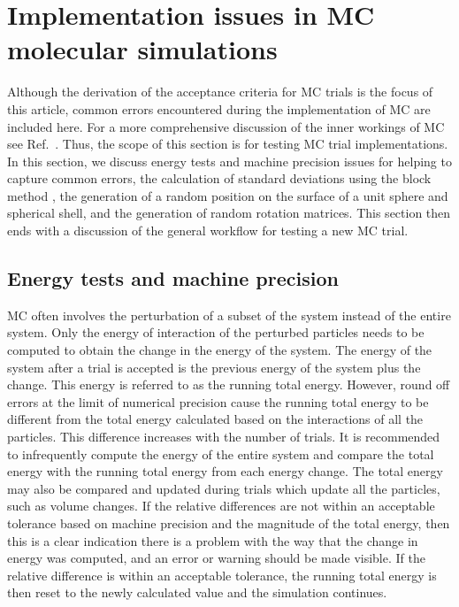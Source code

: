 \documentclass[
  9pt,
  bestpractices,
]{livecoms}
\begin{document}
\section{\label{sec:common_issues}Implementation issues in MC molecular simulations}

Although the derivation of the acceptance criteria for MC trials is the focus of this article, common errors encountered during the implementation of MC are included here.
For a more comprehensive discussion of the inner workings of MC see Ref.~\cite{dubbeldam_inner_2013}.
Thus, the scope of this section is for testing MC trial implementations.
In this section, we discuss energy tests and machine precision issues for helping to capture common errors, the calculation of standard deviations using the block method \cite{flyvbjerg_error_1989, grossfield_best_2018}, the generation of a random position on the surface of a unit sphere and spherical shell, and the generation of random rotation matrices.
This section then ends with a discussion of the general workflow for testing a new MC trial.

\subsection{\label{sec:energy_test}Energy tests and machine precision}

MC often involves the perturbation of a subset of the system instead of the entire system.
Only the energy of interaction of the perturbed particles needs to be computed to obtain the change in the energy of the system.
The energy of the system after a trial is accepted is the previous energy of the system plus the change.
This energy is referred to as the running total energy.
However, round off errors at the limit of numerical precision cause the running total energy to be different from the total energy calculated based on the interactions of all the particles.
This difference increases with the number of trials.
It is recommended to infrequently compute the energy of the entire system and compare the total energy with the running total energy from each energy change.
The total energy may also be compared and updated during trials which update all the particles, such as volume changes.
If the relative differences are not within an acceptable tolerance based on machine precision and the magnitude of the total energy, then this is a clear indication there is a problem with the way that the change in energy was computed, and an error or warning should be made visible.
If the relative difference is within an acceptable tolerance, the running total energy is then reset to the newly calculated value and the simulation continues.
\end{document}
